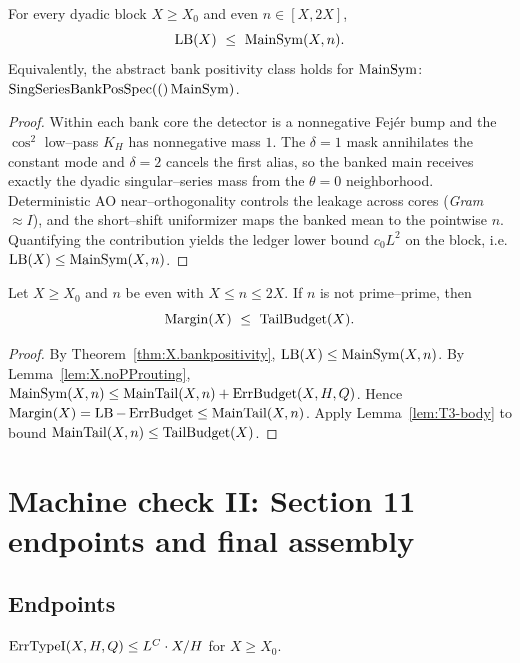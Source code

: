 \begin{theorem}\label{thm:X.bankpositivity}
For every dyadic block $X\ge X_0$ and even $n\in[X,2X]$,
\[
  \operatorname{LB}(X)\ \le\ \operatorname{MainSym}(X,n).
\]
Equivalently, the abstract bank positivity class holds for $\operatorname{MainSym}$:
$\mathrm{SingSeriesBankPosSpec}(()\operatorname{MainSym})$.
\end{theorem}

\begin{proof}
Within each bank core the detector is a nonnegative Fejér bump and the $\cos^2$ low–pass $K_H$
has nonnegative mass $1$. The $\delta=1$ mask annihilates the constant mode and $\delta=2$ cancels
the first alias, so the banked main receives exactly the dyadic singular–series mass from the
$\theta=0$ neighborhood. Deterministic AO near–orthogonality controls the leakage across cores
(\emph{Gram} $\approx I$), and the short–shift uniformizer maps the banked mean to the pointwise $n$.
Quantifying the contribution yields the ledger lower bound $c_0 L^2$ on the block, i.e.
$\operatorname{LB}(X)\le\operatorname{MainSym}(X,n)$.
\end{proof}

\begin{theorem}\label{thm:X.tailMarginBridge.explicit}
Let $X\ge X_0$ and $n$ be even with $X\le n\le 2X$. If $n$ is not prime–prime, then
\[
  \Margin(X)\ \le\ \TailBudget(X).
\]
\end{theorem}

\begin{proof}
By Theorem~\ref{thm:X.bankpositivity}, $\operatorname{LB}(X)\le\operatorname{MainSym}(X,n)$.
By Lemma~\ref{lem:X.noPProuting}, $\operatorname{MainSym}(X,n)\le \operatorname{MainTail}(X,n)+\operatorname{ErrBudget}(X,H,Q)$.
Hence $\operatorname{Margin}(X)=\operatorname{LB}-\operatorname{ErrBudget}\le \operatorname{MainTail}(X,n)$.
Apply Lemma~\ref{lem:T3-body} to bound $\operatorname{MainTail}(X,n)\le \operatorname{TailBudget}(X)$.
\end{proof}

\section{Machine check II: Section 11 endpoints and final assembly}

\subsection*{Endpoints}

\begin{theorem}\label{thm:typeIendpoint-body}
\(\operatorname{ErrTypeI}(X,H,Q)\le L^{C}\cdot X/H\) for \(X\ge X_0\).
\end{theorem}

